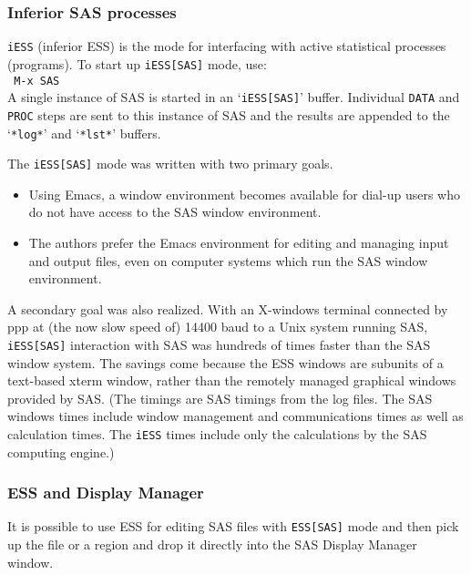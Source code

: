 \documentclass{article}
\newcommand{\stexttt}[1]{{\small\texttt{#1}}}
\newcommand{\ssf}[1]{{\small\sf{#1}}}
\newcommand{\elcode}[1]{\\{\stexttt{\hspace*{2em} #1}}\\}
\newcommand{\file}[1]{`\stexttt{#1}'}
\begin{document}
\subsubsection{Inferior SAS processes}
\label{sec:SAS:proc:inf}

\stexttt{iESS} (inferior ESS) is the mode for interfacing with active
statistical processes (programs).  To start up \stexttt{iESS[SAS]} mode, use:
\elcode{M-x SAS}
A single instance of SAS is started in an \file{iESS[SAS]} buffer.  Individual
\stexttt{DATA} and \stexttt{PROC} steps are sent to this instance of SAS and the results
are appended to the \file{*log*} and \file{*lst*} buffers.

The \stexttt{iESS[SAS]} mode was written with two primary goals.
\begin{itemize}
\item Using Emacs, a window environment becomes available for dial-up
  users who do not have access to the SAS window environment.
\item The authors prefer the Emacs environment for editing and
  managing input and output files, even on computer systems which run
  the SAS window environment.
\end{itemize}
A secondary goal was also realized.  With an X-windows
terminal connected by ppp at (the now slow speed of)
14400 baud to a Unix system running SAS,
\stexttt{iESS[SAS]} interaction with SAS was hundreds of times faster than the
SAS window system.  The savings come because the ESS windows are
subunits of a text-based xterm window, rather than the remotely
managed graphical windows provided by SAS.  (The timings are SAS
timings from the log files.  The SAS windows times include window
management and communications times as well as calculation times.  The
\stexttt{iESS} times include only the calculations by the SAS computing engine.)

\subsubsection{ESS and Display Manager}
It is possible to use ESS for editing SAS files with \stexttt{ESS[SAS]} mode
and then pick up the file or a region and drop it directly into the SAS
Display Manager \ssf{Program Editor} window.
\end{document}

